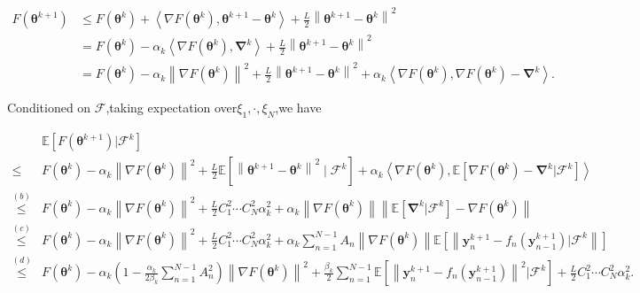 \begin{equation*}
\begin{split}
F(\boldsymbol{\theta}^{k+1})&\leq F(\boldsymbol{\theta}^k)+\left \langle \nabla F(\boldsymbol{\theta}^k),\boldsymbol{\theta}^{k+1}-\boldsymbol{\theta}^k \right \rangle+\frac{L}{2}\left \| \boldsymbol{\theta}^{k+1}-\boldsymbol{\theta}^k \right \|^2\\
&=F(\boldsymbol{\theta}^k)-\alpha_k\left \langle \nabla F(\boldsymbol{\theta}^k),\boldsymbol{\nabla}^k \right \rangle+\frac{L}{2}\left \| \boldsymbol{\theta}^{k+1}-\boldsymbol{\theta}^k \right \|^2\\
&=F(\boldsymbol{\theta}^k)-\alpha_k\left \| \nabla F(\boldsymbol{\theta}^k) \right \|^2+\frac{L}{2}\left \| \boldsymbol{\theta}^{k+1}-\boldsymbol{\theta}^k \right \|^2+\alpha_k\left \langle \nabla F(\boldsymbol{\theta}^k),\nabla F(\boldsymbol{\theta}^k)-\boldsymbol{\nabla}^k \right \rangle.
\end{split}
\end{equation*}

Conditioned on $\mathcal{F}$,taking expectation over$\xi_1,\cdot,\xi_N$,we have

\begin{equation*}
\begin{split}
&\mathbb{E}\left[ F\left(\boldsymbol{\theta}^{k+1}\right)|\mathcal{F}^k\right]\\
\leq &F(\boldsymbol{\theta}^k)-\alpha_k\left \| \nabla F(\boldsymbol{\theta}^k) \right \|^2+\frac{L}{2}\mathbb{E}\left [ \left \| \boldsymbol{\theta}^{k+1}-\boldsymbol{\theta}^k \right \|^2\mid \mathcal{F}^k \right ]+\alpha_k\left \langle \nabla F(\boldsymbol{\theta}^k),\mathbb{E}\left [\nabla F(\boldsymbol{\theta}^k)-\boldsymbol{\nabla}^k|\mathcal{F}^k \right ] \right \rangle\\
\overset{(b)}{\leq}&F(\boldsymbol{\theta}^k)-\alpha_k\left \| \nabla F(\boldsymbol{\theta}^k) \right \|^2+\frac{L}{2}C_1^2\cdots C_N^2\alpha_k^2+\alpha_k\left \| \nabla F(\boldsymbol{\theta}^k) \right \|\left \| \mathbb{E}\left [ \boldsymbol{\nabla}^k|\mathcal{F}^k \right ]-\nabla F(\boldsymbol{\theta}^k)\right \|\\
\overset{(c)}{\leq}&F(\boldsymbol{\theta}^k)-\alpha_k\left \| \nabla F(\boldsymbol{\theta}^k) \right \|^2+\frac{L}{2}C_1^2\cdots C_N^2\alpha_k^2+\alpha_k\sum_{n=1}^{N-1}A_n\left \| \nabla F(\boldsymbol{\theta}^k) \right \|\mathbb{E}\left [ \left \| \boldsymbol{y}_n^{k+1}-f_n(\boldsymbol{y}_{n-1}^{k+1})|\mathcal{F}^k \right \| \right ]\\
\overset{(d)}{\leq}&F(\boldsymbol{\theta}^k)-\alpha_k\left ( 1-\frac{\alpha_k}{2\beta_k}\sum_{n=1}^{N-1}A_n^2 \right )\left \| \nabla F(\boldsymbol{\theta}^k) \right \|^2+\frac{\beta_k}{2}\sum_{n=1}^{N-1}\mathbb{E}\left [\left \| \boldsymbol{y}_n^{k+1}-f_n(\boldsymbol{y}_{n-1}^{k+1}) \right \|^2|\mathcal{F}^k \right ]+\frac{L}{2}C_1^2\cdots C_N^2\alpha_k^2.
\end{split}
\end{equation*}

